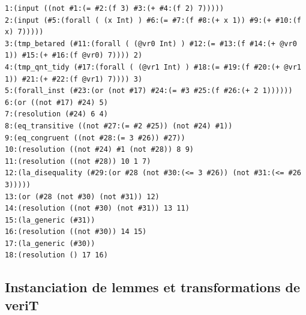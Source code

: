 \documentclass[11pt]{article}
\begin{document}
\begin{lstlisting}[frame=single]
1:(input ((not #1:(= #2:(f 3) #3:(+ #4:(f 2) 7)))))
2:(input (#5:(forall ( (x Int) ) #6:(= #7:(f #8:(+ x 1)) #9:(+ #10:(f x) 7)))))
3:(tmp_betared (#11:(forall ( (@vr0 Int) ) #12:(= #13:(f #14:(+ @vr0 1)) #15:(+ #16:(f @vr0) 7)))) 2)
4:(tmp_qnt_tidy (#17:(forall ( (@vr1 Int) ) #18:(= #19:(f #20:(+ @vr1 1)) #21:(+ #22:(f @vr1) 7)))) 3)
5:(forall_inst (#23:(or (not #17) #24:(= #3 #25:(f #26:(+ 2 1))))))
6:(or ((not #17) #24) 5)
7:(resolution (#24) 6 4)
8:(eq_transitive ((not #27:(= #2 #25)) (not #24) #1))
9:(eq_congruent ((not #28:(= 3 #26)) #27))
10:(resolution ((not #24) #1 (not #28)) 8 9)
11:(resolution ((not #28)) 10 1 7)
12:(la_disequality (#29:(or #28 (not #30:(<= 3 #26)) (not #31:(<= #26 3)))))
13:(or (#28 (not #30) (not #31)) 12)
14:(resolution ((not #30) (not #31)) 13 11)
15:(la_generic (#31))
16:(resolution ((not #30)) 14 15)
17:(la_generic (#30))
18:(resolution () 17 16)
\end{lstlisting}


\subsection{Instanciation de lemmes et transformations de veriT} \label{annexe_simplifications}
\end{document}
